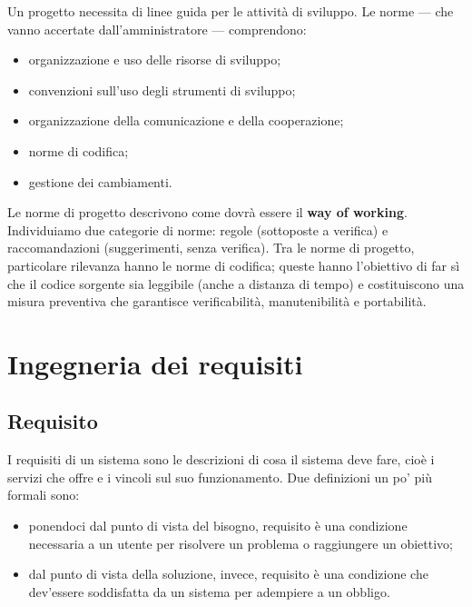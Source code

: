 \documentclass[a4paper]{article}
\begin{document}
		
Un progetto necessita di linee guida per le attività di sviluppo. Le norme --- che vanno accertate dall'amministratore --- comprendono:
		
	\begin{itemize}
		
			
	\item organizzazione e uso delle risorse di sviluppo;
			
	\item convenzioni sull'uso degli strumenti di sviluppo;
			
	\item organizzazione della comunicazione e della cooperazione;
			
	\item norme di codifica;
			
	\item gestione dei cambiamenti.
		
	\end{itemize}

		
Le norme di progetto descrivono come dovrà essere il \textbf{way of working}. Individuiamo due categorie di norme: regole (sottoposte a verifica) e raccomandazioni (suggerimenti, senza verifica). Tra le norme di progetto, particolare rilevanza hanno le norme di codifica; queste hanno l'obiettivo di far sì che il codice sorgente sia leggibile (anche a distanza di tempo) e costituiscono una misura preventiva che garantisce verificabilità, manutenibilità e portabilità.
	


		
	\section{Ingegneria dei requisiti}


		
	\subsection{Requisito}

		
I requisiti di un sistema sono le descrizioni di cosa il sistema deve fare, cioè i servizi che offre e i vincoli sul suo funzionamento. Due definizioni un po' più formali sono:
		
	\begin{itemize}
		
			
	\item ponendoci dal punto di vista del bisogno, requisito è una condizione necessaria a un utente per risolvere un problema o raggiungere un obiettivo;
			
	\item dal punto di vista della soluzione, invece, requisito è una condizione che dev'essere soddisfatta da un sistema per adempiere a un obbligo.
		
	\end{itemize}
\end{document}
